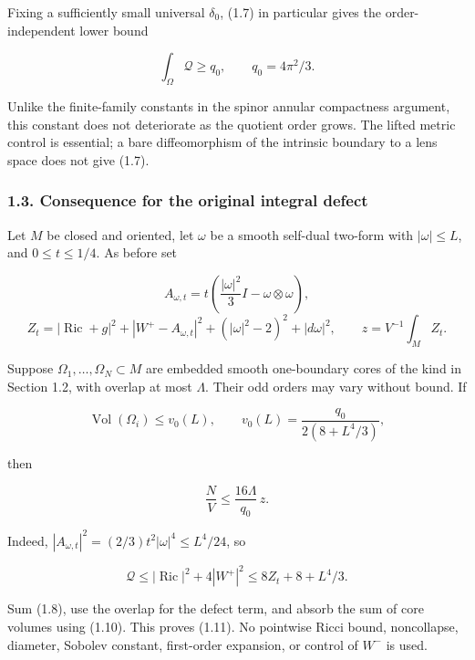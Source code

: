 \documentclass[
  10pt,
]{article}
\begin{document}
Fixing a sufficiently small universal \(\delta_0\), (1.7) in particular
gives the order-independent lower bound

\[
                  \int_\Omega\mathscr Q\ge q_0,
                  \qquad q_0=4\pi^2/3.              \tag{1.8}
\]

Unlike the finite-family constants in the spinor annular compactness
argument, this constant does not deteriorate as the quotient order
grows. The lifted metric control is essential; a bare diffeomorphism of
the intrinsic boundary to a lens space does not give (1.7).

\hypertarget{consequence-for-the-original-integral-defect}{%
\subsubsection{1.3. Consequence for the original integral
defect}\label{consequence-for-the-original-integral-defect}}

Let \(M\) be closed and oriented, let \(\omega\) be a smooth self-dual
two-form with \(|\omega|\le L\), and \(0\le t\le1/4\). As before set

\[
 A_{\omega,t}=t\left(\frac{|\omega|^2}{3}I-\omega\otimes\omega\right),
\] \[
 Z_t=|\operatorname{Ric}+g|^2+|W^+-A_{\omega,t}|^2
                         +( |\omega|^2-2)^2+|d\omega|^2,
 \qquad z=V^{-1}\int_M Z_t.                         \tag{1.9}
\]

Suppose \(\Omega_1,\ldots,\Omega_N\subset M\) are embedded smooth
one-boundary cores of the kind in Section 1.2, with overlap at most
\(\Lambda\). Their odd orders may vary without bound. If

\[
 \operatorname{Vol}(\Omega_i)\le v_0(L),\qquad
 v_0(L)=\frac{q_0}{2(8+L^4/3)},
                                                        \tag{1.10}
\]

then

\[
                    \boxed{\frac NV\le\frac{16\Lambda}{q_0}\,z.}
                                                        \tag{1.11}
\]

Indeed, \(|A_{\omega,t}|^2=(2/3)t^2|\omega|^4\le L^4/24\), so

\[
 \mathscr Q\le |\operatorname{Ric}|^2+4|W^+|^2
          \le8Z_t+8+L^4/3.                         \tag{1.12}
\]

Sum (1.8), use the overlap for the defect term, and absorb the sum of
core volumes using (1.10). This proves (1.11). No pointwise Ricci bound,
noncollapse, diameter, Sobolev constant, first-order expansion, or
control of \(W^-\) is used.
\end{document}
